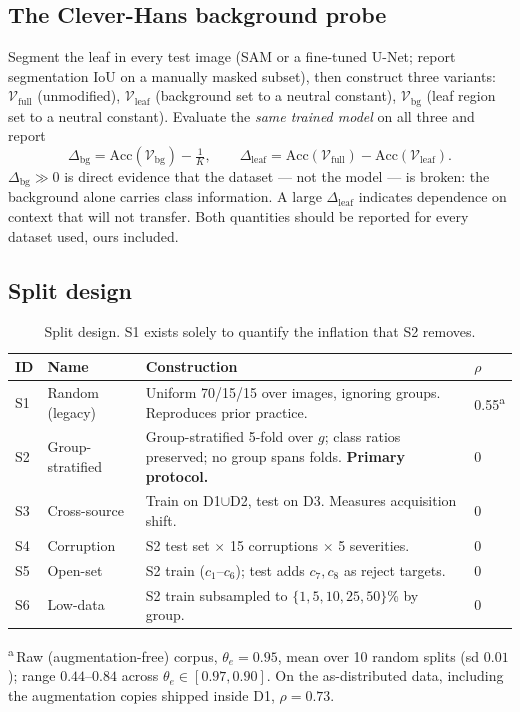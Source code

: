 \documentclass[10pt,twocolumn,a4paper]{article}
\begin{document}
\subsection{The Clever-Hans background probe}
\label{sec:cleverhans}
Segment the leaf in every test image (SAM or a fine-tuned U-Net; report segmentation IoU on a manually masked subset), then construct three variants:
$\mathcal{V}_{\text{full}}$ (unmodified), $\mathcal{V}_{\text{leaf}}$ (background set to a neutral constant), $\mathcal{V}_{\text{bg}}$ (leaf region set to a neutral constant). Evaluate the \emph{same trained model} on all three and report
\begin{equation}
\Delta_{\text{bg}} = \mathrm{Acc}(\mathcal{V}_{\text{bg}}) - \tfrac{1}{K},
\qquad
\Delta_{\text{leaf}} = \mathrm{Acc}(\mathcal{V}_{\text{full}}) - \mathrm{Acc}(\mathcal{V}_{\text{leaf}}).
\end{equation}
$\Delta_{\text{bg}} \gg 0$ is direct evidence that the dataset --- not the model --- is broken: the background alone carries class information. A large $\Delta_{\text{leaf}}$ indicates dependence on context that will not transfer. Both quantities should be reported for every dataset used, ours included.

\subsection{Split design}
\label{sec:splits}
\begin{table}[H]
\centering
\caption{Split design. S1 exists solely to quantify the inflation that S2 removes.}
\label{tab:splits}
{\footnotesize
\begin{tabularx}{\columnwidth}{@{}p{0.55cm} p{2.0cm} X p{0.6cm}@{}}
\toprule
\rowcolor{hdrgray}
ID & Name & Construction & $\rho$ \\
\midrule
S1 & Random (legacy) & Uniform 70/15/15 over images, ignoring groups. Reproduces prior practice. & 0.55\textsuperscript{a} \\
S2 & Group-stratified & Group-stratified 5-fold over $g$; class ratios preserved; no group spans folds. \textbf{Primary protocol.} & 0 \\
S3 & Cross-source & Train on D1$\cup$D2, test on D3. Measures acquisition shift. & 0 \\
S4 & Corruption & S2 test set $\times$ 15 corruptions $\times$ 5 severities. & 0 \\
S5 & Open-set & S2 train ($c_1$--$c_6$); test adds $c_7,c_8$ as reject targets. & 0 \\
S6 & Low-data & S2 train subsampled to $\{1,5,10,25,50\}$\% by group. & 0 \\
\bottomrule
\end{tabularx}}

{\scriptsize \textsuperscript{a}\,Raw (augmentation-free) corpus, $\theta_e=0.95$, mean over 10 random splits (sd $0.01$); range $0.44$--$0.84$ across $\theta_e\in[0.97,0.90]$. On the as-distributed data, including the augmentation copies shipped inside D1, $\rho=0.73$.}
\end{table}
\end{document}
